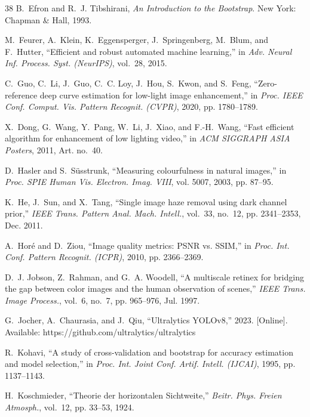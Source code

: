 \documentclass[journal]{IEEEtran}
\begin{document}
\begin{thebibliography}{38}
B.~Efron and R.~J. Tibshirani, \emph{An Introduction to the Bootstrap}. New York: Chapman \& Hall, 1993.

M.~Feurer, A.~Klein, K.~Eggensperger, J.~Springenberg, M.~Blum, and F.~Hutter, ``Efficient and robust automated machine learning,'' in \emph{Adv. Neural Inf. Process. Syst. (NeurIPS)}, vol.~28, 2015.

C.~Guo, C.~Li, J.~Guo, C.~C. Loy, J.~Hou, S.~Kwon, and S.~Feng, ``Zero-reference deep curve estimation for low-light image enhancement,'' in \emph{Proc. IEEE Conf. Comput. Vis. Pattern Recognit. (CVPR)}, 2020, pp. 1780--1789.

X.~Dong, G.~Wang, Y.~Pang, W.~Li, J.~Xiao, and F.-H.~Wang, ``Fast efficient algorithm for enhancement of low lighting video,'' in \emph{ACM SIGGRAPH ASIA Posters}, 2011, Art. no.~40.

D.~Hasler and S.~S{\"u}sstrunk, ``Measuring colourfulness in natural images,'' in \emph{Proc. SPIE Human Vis. Electron. Imag. VIII}, vol. 5007, 2003, pp. 87--95.

K.~He, J.~Sun, and X.~Tang, ``Single image haze removal using dark channel prior,'' \emph{IEEE Trans. Pattern Anal. Mach. Intell.}, vol.~33, no.~12, pp. 2341--2353, Dec. 2011.

A.~Hor{\'e} and D.~Ziou, ``Image quality metrics: PSNR vs. SSIM,'' in \emph{Proc. Int. Conf. Pattern Recognit. (ICPR)}, 2010, pp. 2366--2369.

D.~J. Jobson, Z.~Rahman, and G.~A. Woodell, ``A multiscale retinex for bridging the gap between color images and the human observation of scenes,'' \emph{IEEE Trans. Image Process.}, vol.~6, no.~7, pp. 965--976, Jul. 1997.

G.~Jocher, A.~Chaurasia, and J.~Qiu, ``Ultralytics YOLOv8,'' 2023. [Online]. Available: https://github.com/ultralytics/ultralytics

R.~Kohavi, ``A study of cross-validation and bootstrap for accuracy estimation and model selection,'' in \emph{Proc. Int. Joint Conf. Artif. Intell. (IJCAI)}, 1995, pp. 1137--1143.

H.~Koschmieder, ``Theorie der horizontalen Sichtweite,'' \emph{Beitr. Phys. Freien Atmosph.}, vol.~12, pp. 33--53, 1924.


\end{thebibliography}
\end{document}
